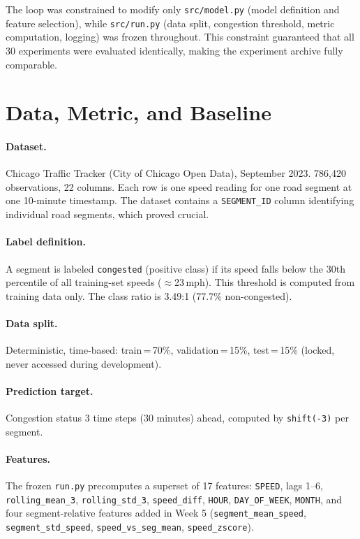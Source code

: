 \documentclass{article}
\begin{document}
The loop was constrained to modify only \texttt{src/model.py} (model definition and
feature selection), while \texttt{src/run.py} (data split, congestion threshold, metric
computation, logging) was frozen throughout. This constraint guaranteed that all
30 experiments were evaluated identically, making the experiment archive fully comparable.

\section{Data, Metric, and Baseline}

\paragraph{Dataset.} Chicago Traffic Tracker (City of Chicago Open Data), September 2023.
786,420 observations, 22 columns. Each row is one speed reading for one road segment at
one 10-minute timestamp. The dataset contains a \texttt{SEGMENT\_ID} column identifying
individual road segments, which proved crucial.

\paragraph{Label definition.} A segment is labeled \texttt{congested} (positive class)
if its speed falls below the 30th percentile of all training-set speeds ($\approx$23\,mph).
This threshold is computed from training data only. The class ratio is 3.49:1
(77.7\% non-congested).

\paragraph{Data split.} Deterministic, time-based:
train\,=\,70\%, validation\,=\,15\%, test\,=\,15\% (locked, never accessed during development).

\paragraph{Prediction target.} Congestion status 3 time steps (30 minutes) ahead,
computed by \texttt{shift(-3)} per segment.

\paragraph{Features.} The frozen \texttt{run.py} precomputes a superset of 17 features:
\texttt{SPEED}, lags 1--6, \texttt{rolling\_mean\_3}, \texttt{rolling\_std\_3},
\texttt{speed\_diff}, \texttt{HOUR}, \texttt{DAY\_OF\_WEEK}, \texttt{MONTH}, and
four segment-relative features added in Week 5 (\texttt{segment\_mean\_speed},
\texttt{segment\_std\_speed}, \texttt{speed\_vs\_seg\_mean}, \texttt{speed\_zscore}).
\end{document}
